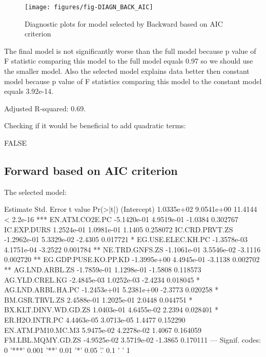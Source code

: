 \documentclass[a4paper]{article}
\begin{document}
\begin{figure}[H]
\begin{center}
\texttt{[image: figures/fig-DIAGN\_BACK\_AIC]}
\caption{Diagnostic plots for model selected by Backward based on AIC criterion}
\end{center}
\end{figure}
The final model is not significantly worse than
the full model because p value of F statistic comparing this model to the full
model equals
0.97 so we should use the smaller model. Also the selected model explains data better then constant model because p value of F statistics comparing this model to the
constant model equals 
3.92e-14.

Adjusted R-squared:
0.69.

Checking if it would be beneficial to add quadratic terms:
\begin{Schunk}
\begin{Soutput}
[1] FALSE
\end{Soutput}
\end{Schunk}

\subsection{Forward based on AIC criterion}
The selected model:
\begin{Schunk}
\begin{Soutput}
                        Estimate  Std. Error t value  Pr(>|t|)    
(Intercept)           1.0335e+02  9.0541e+00 11.4144 < 2.2e-16 ***
EN.ATM.CO2E.PC       -5.1420e-01  4.9519e-01 -1.0384  0.302767    
IC.EXP.DURS           1.2524e-01  1.0981e-01  1.1405  0.258072    
IC.CRD.PRVT.ZS       -1.2962e-01  5.3329e-02 -2.4305  0.017721 *  
EG.USE.ELEC.KH.PC    -1.3578e-03  4.1751e-04 -3.2522  0.001784 ** 
NE.TRD.GNFS.ZS       -1.1061e-01  3.5546e-02 -3.1116  0.002720 ** 
EG.GDP.PUSE.KO.PP.KD -1.3995e+00  4.4945e-01 -3.1138  0.002702 ** 
AG.LND.ARBL.ZS       -1.7859e-01  1.1298e-01 -1.5808  0.118573    
AG.YLD.CREL.KG       -2.4845e-03  1.0252e-03 -2.4234  0.018045 *  
AG.LND.ARBL.HA.PC    -1.2453e+01  5.2381e+00 -2.3773  0.020258 *  
BM.GSR.TRVL.ZS        2.4588e-01  1.2025e-01  2.0448  0.044751 *  
BX.KLT.DINV.WD.GD.ZS  1.0403e-01  4.6455e-02  2.2394  0.028401 *  
ER.H2O.INTR.PC        4.4463e-05  3.0713e-05  1.4477  0.152290    
EN.ATM.PM10.MC.M3     5.9475e-02  4.2278e-02  1.4067  0.164059    
FM.LBL.MQMY.GD.ZS    -4.9525e-02  3.5719e-02 -1.3865  0.170111    
---
Signif. codes:  0 '***' 0.001 '**' 0.01 '*' 0.05 '.' 0.1 ' ' 1
\end{Soutput}
\end{Schunk}
\end{document}
